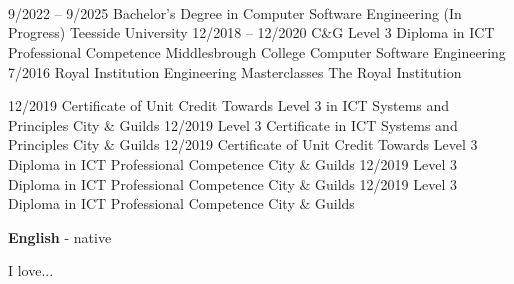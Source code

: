 \documentclass[9pt]{developercv} %
\begin{document}
\begin{entrylist}
{		\lorem \lorem \lorem \lorem \lorem\\ %
		
		\\
		}\\
\end{entrylist}




\begin{entrylist}
	\entry
		{9/2022 -- 9/2025}
		{Bachelor's Degree in Computer Software Engineering (In Progress)}
		{Teesside University}
		{}
	\entry
		{12/2018 -- 12/2020}
		{C\&G Level 3 Diploma in ICT Professional Competence}
		{Middlesbrough College}
		{Computer Software Engineering}
	\entry
		{7/2016}
		{Royal Institution Engineering Masterclasses}
		{The Royal Institution}
		{}
\end{entrylist}

\begin{entrylist}
	\entry
		{12/2019}
		{Certificate of Unit Credit Towards Level 3 in ICT Systems and Principles}
		{City \& Guilds}
		{}
	\entry
		{12/2019}
		{Level 3 Certificate in ICT Systems and Principles}
		{City \& Guilds}
		{}
	\entry
		{12/2019}
		{Certificate of Unit Credit Towards Level 3 Diploma in ICT Professional Competence}
		{City \& Guilds}
		{}
	\entry
		{12/2019}
		{Level 3 Diploma in ICT Professional Competence}
		{City \& Guilds}
		{}
	\entry
		{12/2019}
		{Level 3 Diploma in ICT Professional Competence}
		{City \& Guilds}
		{}
\end{entrylist}




\begin{minipage}[t]{0.3\textwidth}
	\vspace{-\baselineskip} %

	
	\textbf{English} - native\\
\end{minipage}
\hfill
\begin{minipage}[t]{0.7\textwidth}
	\vspace{-\baselineskip} %
	
	
	I love... \lorem
\end{minipage}
\end{document}
